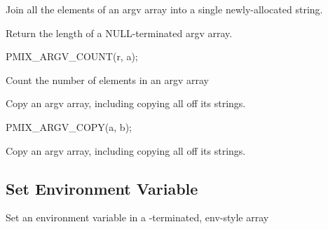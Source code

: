 \begin{arglist}
\end{arglist}

\descr

Join all the elements of an argv array into a single newly-allocated string.


\summary

Return the length of a NULL-terminated argv array.

\cspecificstart
\begin{codepar}
PMIX_ARGV_COUNT(r, a);
\end{codepar}
\cspecificend

\begin{arglist}
\end{arglist}

\descr

Count the number of elements in an argv array



\summary

Copy an argv array, including copying all off its strings.

\cspecificstart
\begin{codepar}
PMIX_ARGV_COPY(a, b);
\end{codepar}
\cspecificend

\begin{arglist}
\end{arglist}

\descr

Copy an argv array, including copying all off its strings.


\subsection{Set Environment Variable}

\summary

Set an environment variable in a -terminated, env-style array


